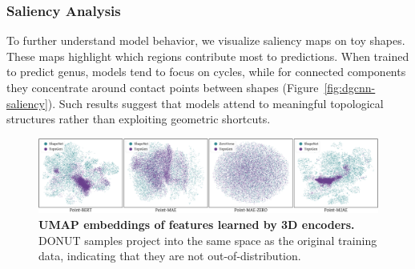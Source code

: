\subsubsection{Saliency Analysis}
\label{sssec:topogen-saliency}

To further understand model behavior, we visualize saliency maps on toy shapes. These maps highlight which regions contribute most to predictions. When trained to predict genus, models tend to focus on cycles, while for connected components they concentrate around contact points between shapes (Figure~\ref{fig:dgcnn-saliency}). Such results suggest that models attend to meaningful topological structures rather than exploiting geometric shortcuts.

\begin{figure}[t!]
  \centering
  \includegraphics[width=\linewidth]{figs/topogen/umaps_overview.pdf}
  \caption{\textbf{UMAP embeddings of features learned by 3D encoders.} DONUT samples project into the same space as the original training data, indicating that they are not out-of-distribution.}
  \label{fig:topogen-umaps-overview}
\end{figure}

